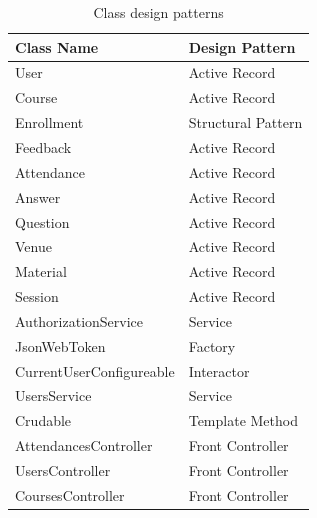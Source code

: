 \begin{justify}
\renewcommand{\arraystretch}{1.0}
\begin{table}[H]
\centering
\caption{Class design patterns}
\begin{tabular}{|p{7.25cm}|p{7.25cm}|} 
\hline
\rowcolor[rgb]{0.835,0.863,0.894} \textbf{Class Name} & \textbf{Design Pattern}  \\ 
\hline
User                                                  & Active Record            \\ 
\hline
Course                                                & Active Record            \\ 
\hline
Enrollment                                          & Structural Pattern       \\ 
\hline
Feedback                                              & Active Record            \\ 
\hline
Attendance                                            & Active Record            \\
\hline
Answer                                            & Active Record            \\ 
\hline
Question                                            & Active Record            \\ 
\hline
Venue                                                 & Active Record            \\ 
\hline
Material                                              & Active Record            \\ 
\hline
Session                                               & Active Record            \\ 
\hline
AuthorizationService                                  & Service                  \\ 
\hline
JsonWebToken                                          & Factory                  \\ 
\hline
CurrentUserConfigureable                              & Interactor               \\ 
\hline
UsersService                                          & Service                  \\ 
\hline
Crudable                               & Template Method                  \\ 
\hline
AttendancesController                                              & Front Controller          \\ 
\hline
UsersController                                       & Front Controller         \\ 
\hline
CoursesController                                     & Front Controller         \\ 

\end{tabular}
\end{table}
\end{justify}
